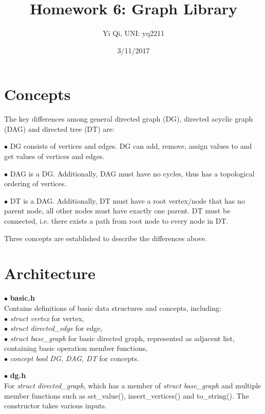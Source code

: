 \documentclass[11pt, oneside]{article}   	%
\title{Homework 6: Graph Library}
\author{Yi Qi, UNI: yq2211}
\date{3/11/2017}							%
\begin{document}
\maketitle

\section*{Concepts}

The key differences among general directed graph (DG), directed acyclic graph (DAG) and directed tree (DT) are:

$\bullet$ DG consists of vertices and edges. DG can add, remove, assign values to and get values of vertices and edges.

$\bullet$ DAG is a DG. Additionally, DAG must have no cycles, thus has a topological ordering of vertices.

$\bullet$ DT is a DAG. Additionally, DT must have a root vertex/node that has no parent node, all other nodes must have exactly one parent. DT must be connected, i.e. there exists a path from root node to every node in DT.

Three concepts are established to describe the differences above.

\section*{Architecture}

$\bullet$ \textbf{basic.h}\\
Contains definitions of basic data structures and concepts, including:\\
\-\hspace{.5cm} $\bullet$  \textit{struct vertex} for vertex,\\
\-\hspace{.5cm} $\bullet$  \textit{struct directed\_edge} for edge,\\
\-\hspace{.5cm} $\bullet$  \textit{struct base\_graph} for basic directed graph, represented as adjacent list, containing basic operation member functions,\\
\-\hspace{.5cm} $\bullet$  \textit{concept bool DG, DAG, DT} for concepts.

$\bullet$ \textbf{dg.h}\\
For \textit{struct directed\_graph}, which has a member of \textit{struct base\_graph} and multiple member functions such as set\_value(), insert\_vertices() and to\_string(). The constructor takes various inputs.
\end{document}
